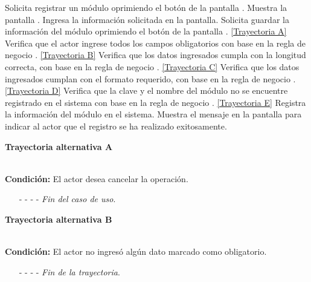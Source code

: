 	\begin{UCtrayectoria}
		\UCpaso[\UCactor] Solicita registrar un módulo oprimiendo el botón  de la pantalla .
		\UCpaso[\UCsist] Muestra la pantalla .
		\UCpaso[\UCactor] Ingresa la información solicitada en la pantalla. \label{CU5.1-P3}
		\UCpaso[\UCactor] Solicita guardar la información del módulo oprimiendo el botón  de la pantalla . \hyperlink{CU5-1:TAA}{[Trayectoria A]}
		\UCpaso[\UCsist] Verifica que el actor ingrese todos los campos obligatorios con base en la regla de negocio . \hyperlink{CU5-1:TAB}{[Trayectoria B]}
		\UCpaso[\UCsist] Verifica que los datos ingresados cumpla con la longitud correcta, con base en la regla de negocio . \hyperlink{CU5-1:TAC}{[Trayectoria C]}
		\UCpaso[\UCsist] Verifica que los datos ingresados cumplan con el formato requerido, con base en la regla de negocio . \hyperlink{CU5-1:TAD}{[Trayectoria D]}
		\UCpaso[\UCsist] Verifica que la clave y el nombre del módulo no se encuentre registrado en el sistema con base en la regla de negocio . \hyperlink{CU5-1:TAE}{[Trayectoria E]}
		\UCpaso[\UCsist] Registra la información del módulo en el sistema.
		\UCpaso[\UCsist] Muestra el mensaje  en la pantalla  para indicar al actor que el registro se ha realizado exitosamente.
	\end{UCtrayectoria}		
\hypertarget{CU5-1:TAA}{\textbf{Trayectoria alternativa A}}\\
\noindent \textbf{Condición:} El actor desea cancelar la operación.
\begin{enumerate}
	\UCpaso[\UCactor] Solicita cancelar la operación oprimiendo el botón  de la pantalla 
	\UCpaso[\UCsist] Muestra la pantalla .
	\item[- -] - - {\em {Fin del caso de uso}}.%
\end{enumerate}
\hypertarget{CU5-1:TAB}{\textbf{Trayectoria alternativa B}}\\
\noindent \textbf{Condición:} El actor no ingresó algún dato marcado como obligatorio.
\begin{enumerate}
	\UCpaso[\UCsist] Muestra el mensaje  señalando el campo que presenta el error en la pantalla .
	\UCpaso Regresa al paso \ref{CU5.1-P3} de la trayectoria principal.
	\item[- -] - - {\em {Fin de la trayectoria}}.%
\end{enumerate}
